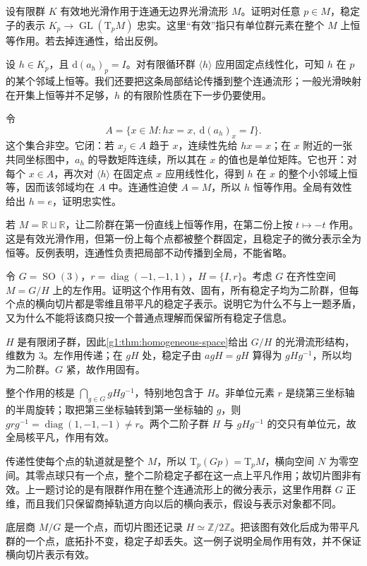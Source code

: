 \begin{exercise}\label{g1:ex:finite-action-faithful-linearization}
	设有限群 \(K\) 有效地光滑作用于连通无边界光滑流形 \(M\)。证明对任意 \(p\in M\)，稳定子的表示 \(K_p\to\operatorname{GL}(\mathrm{T}_pM)\) 忠实。这里“有效”指只有单位群元素在整个 \(M\) 上恒等作用。若去掉连通性，给出反例。
\end{exercise}
\begin{solution}
	设 \(h\in K_p\)，且 \(\mathrm{d}(a_h)_p=I\)。对有限循环群 \(\langle h\rangle\) 应用固定点线性化，可知 \(h\) 在 \(p\) 的某个邻域上恒等。我们还要把这条局部结论传播到整个连通流形；一般光滑映射在开集上恒等并不足够，\(h\) 的有限阶性质在下一步仍要使用。

	令
	\[
		A=\{x\in M:hx=x,\ \mathrm{d}(a_h)_x=I\}.
	\]
	这个集合非空。它闭：若 \(x_j\in A\) 趋于 \(x\)，连续性先给 \(hx=x\)；在 \(x\) 附近的一张共同坐标图中，\(a_h\) 的导数矩阵连续，所以其在 \(x\) 的值也是单位矩阵。它也开：对每个 \(x\in A\)，再次对 \(\langle h\rangle\) 在固定点 \(x\) 应用线性化，得到 \(h\) 在 \(x\) 的整个小邻域上恒等，因而该邻域均在 \(A\) 中。连通性迫使 \(A=M\)，所以 \(h\) 恒等作用。全局有效性给出 \(h=e\)，证明忠实性。

	若 \(M=\mathbb R\sqcup\mathbb R\)，让二阶群在第一份直线上恒等作用，在第二份上按 \(t\mapsto-t\) 作用。这是有效光滑作用，但第一份上每个点都被整个群固定，且稳定子的微分表示全为恒等。反例表明，连通性负责把局部不动传播到全局，不能省略。
\end{solution}

\begin{exercise}\label{g1:ex:effective-transitive-ineffective-slice}
	令 \(G=\operatorname{SO}(3)\)，\(r=\operatorname{diag}(-1,-1,1)\)，\(H=\{I,r\}\)。考虑 \(G\) 在齐性空间 \(M=G/H\) 上的左作用。证明这个作用有效、固有，所有稳定子均为二阶群，但每个点的横向切片都是零维且带平凡的稳定子表示。说明它为什么不与上一题矛盾，又为什么不能将该商只按一个普通点理解而保留所有稳定子信息。
\end{exercise}
\begin{solution}
	\(H\) 是有限闭子群，因此\cref{g1:thm:homogeneous-space}给出 \(G/H\) 的光滑流形结构，维数为 \(3\)。左作用传递；在 \(gH\) 处，稳定子由 \(agH=gH\) 算得为 \(gHg^{-1}\)，所以均为二阶群。\(G\) 紧，故作用固有。

	整个作用的核是 \(\bigcap_{g\in G}gHg^{-1}\)，特别地包含于 \(H\)。非单位元素 \(r\) 是绕第三坐标轴的半周旋转；取把第三坐标轴转到第一坐标轴的 \(g\)，则 \(grg^{-1}=\operatorname{diag}(1,-1,-1)\ne r\)。两个二阶子群 \(H\) 与 \(gHg^{-1}\) 的交只有单位元，故全局核平凡，作用有效。

	传递性使每个点的轨道就是整个 \(M\)，所以 \(\mathrm{T}_p(Gp)=\mathrm{T}_pM\)，横向空间 \(N\) 为零空间。其零点球只有一个点，整个二阶稳定子都在这一点上平凡作用；故切片图非有效。上一题讨论的是有限群作用在整个连通流形上的微分表示，这里作用群 \(G\) 正维，而且我们只保留商掉轨道方向以后的横向表示，假设与表示对象都不同。

	底层商 \(M/G\) 是一个点，而切片图还记录 \(H\simeq\mathbb Z/2\mathbb Z\)。把该图有效化后成为带平凡群的一个点，底拓扑不变，稳定子却丢失。这一例子说明全局作用有效，并不保证横向切片表示有效。
\end{solution}


